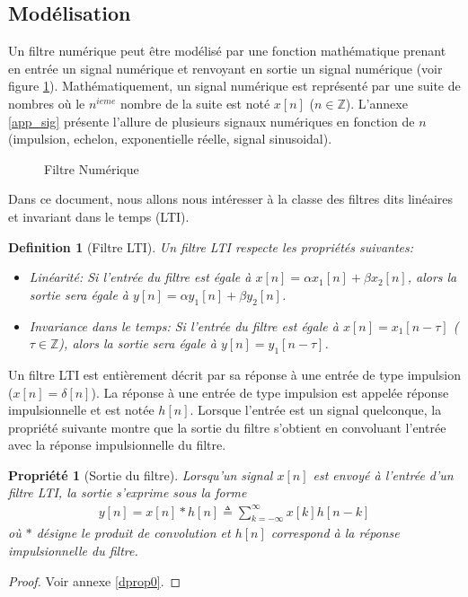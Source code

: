 \documentclass[11pt,a4paper]{IEEEtran}
\newtheorem{propriete}{Propriété}
\newtheorem{definition}{Definition}
\begin{document}
\subsection{Modélisation}

Un filtre numérique peut être modélisé par une fonction mathématique prenant en entrée un signal numérique et renvoyant en sortie un signal numérique (voir figure \ref{deffiltre}). Mathématiquement, un signal numérique est représenté par une suite de nombres où le $n^{ieme}$ nombre de la suite est noté $x[n]$ ($n \in \mathbb{Z}$). L'annexe \ref{app_sig} présente l'allure de plusieurs signaux numériques en fonction de $n$ (impulsion, echelon, exponentielle réelle, signal sinusoidal).

\begin{figure}[!h]
\centering
{}
\caption{Filtre Numérique}
\label{deffiltre}
\end{figure}

Dans ce document, nous allons nous intéresser à la classe des filtres dits linéaires et invariant dans le temps (LTI). 

\begin{definition}[Filtre LTI] Un filtre LTI respecte les propriétés suivantes:
\begin{itemize}
\item Linéarité: Si l'entrée du filtre est égale à $x[n]=\alpha x_1[n]+\beta x_2[n]$, alors la sortie sera égale à $y[n]=\alpha y_1[n]+\beta y_2[n]$.
\item Invariance dans le temps: Si l'entrée du filtre est égale à $x[n]=x_1[n-\tau]$ ($\tau \in \mathbb{Z}$), alors la sortie sera égale à $y[n]=y_1[n-\tau]$.
\end{itemize}
\end{definition}
Un filtre LTI est entièrement décrit par sa réponse à une entrée de type impulsion ($x[n]=\delta[n]$). La réponse à une entrée de type impulsion est appelée réponse impulsionnelle et est notée $h[n]$. Lorsque l'entrée est un signal quelconque, la propriété suivante montre que la sortie du filtre s'obtient en convoluant l'entrée avec la réponse impulsionnelle du filtre.
\begin{propriete}[Sortie du filtre] \label{prop0} Lorsqu'un signal $x[n]$ est envoyé à l'entrée d'un filtre LTI, la sortie s'exprime sous la forme
\begin{align}
y[n]=x[n]*h[n] \triangleq \sum_{k=-\infty}^{\infty}x[k]h[n-k]
\end{align}
où $*$ désigne le produit de convolution et $h[n]$ correspond à la réponse impulsionnelle du filtre.
\end{propriete}
\begin{proof}
Voir annexe \ref{dprop0}.
\end{proof}
\end{document}
